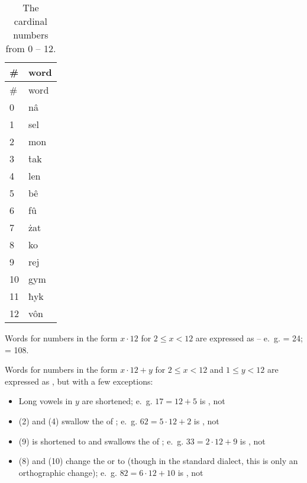 \documentclass{book}
\begin{document}
\begin{longtable}[c]{|l|l|}
    \caption{The cardinal numbers from 0 -- 12.} \\
    
    \hline
    \# & word \\
    \hline
    \endfirsthead
    
    \hline
    \# & word \\
    \hline
    \endhead
    
    \hline
    \endfoot
    
    \hline
    \endlastfoot
    
    0 & nâ \\
    1 & sel \\
    2 & mon \\
    3 & ṫak \\
    4 & len \\
    5 & bê \\
    6 & fû \\
    7 & żat \\
    8 & ko \\
    9 & rej \\
    10 & gym \\
    11 & ħyk \\
    12 & vôn \\
\end{longtable}

Words for numbers in the form $x \cdot 12$ for $2 \le x < 12$ are expressed as  -- e.~g.  = 24;  = 108.

Words for numbers in the form $x \cdot 12 + y$ for $2 \le x < 12$ and $1 \le y < 12$ are expressed as , but with a few exceptions:

\begin{itemize}
    \item Long vowels in $y$ are shortened; e.~g. $17 = 12 + 5$ is , not 
    \item {} (2) and  (4) swallow the  of ; e.~g. $62 = 5 \cdot 12 + 2$ is , not 
    \item {} (9) is shortened to  and swallows the  of ; e.~g. $33 = 2 \cdot 12 + 9$ is , not 
    \item {} (8) and  (10) change the  or  to  (though in the standard dialect, this is only an orthographic change); e.~g. $82 = 6 \cdot 12 + 10$ is , not 
\end{itemize}
\end{document}
